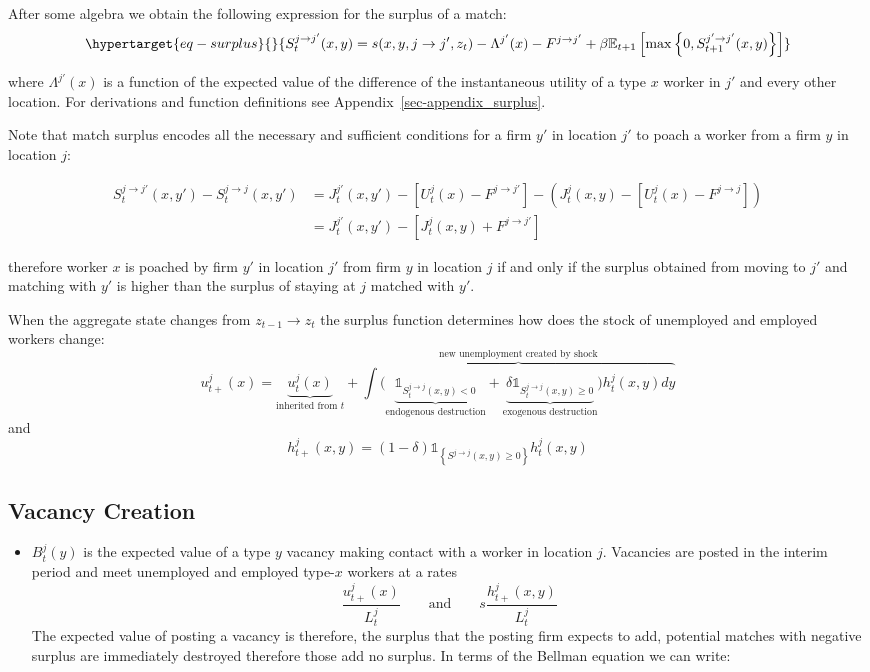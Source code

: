 \documentclass[
  letterpaper,
  DIV=11,
  numbers=noendperiod]{scrreprt}
\providecommand{\tightlist}{%
  \setlength{\itemsep}{0pt}\setlength{\parskip}{0pt}}\usepackage{longtable,booktabs,array}
\begin{document}
After some algebra we obtain the following expression for the surplus of
a match:
\begin{equation}\protect\hypertarget{eq-surplus}{}{S_{t}^{j\to j'}(x,y) = s(x,y,j \to j',z_t) - \Lambda^{j'}(x) - F^{j \to j'} + \beta\mathbb{E}_{t+1}\left[\max\left\{0, S^{j'\to j'}_{t+1}(x,y)\right\}\right]}\label{eq-surplus}\end{equation}

where \(\Lambda^{j'}(x)\) is a function of the expected value of the
difference of the instantaneous utility of a type \(x\) worker in \(j'\)
and every other location. For derivations and function definitions see
Appendix~\ref{sec-appendix_surplus}.

Note that match surplus encodes all the necessary and sufficient
conditions for a firm \(y'\) in location \(j'\) to poach a worker from a
firm \(y\) in location \(j\):

\begin{align*}
  S_t^{j\to j'}(x,y') - S^{j \to j}_t(x,y') &= J^{j'}_{t}(x,y') - [U^{j}_t(x) - F^{j\to j'}] - \left(J^{j}_{t}(x,y) - [U^{j}_t(x) - F^{j\to j}]\right) \\ 
  &=  J^{j'}_{t}(x,y') - [ J^{j}_{t}(x,y) + F^{j\to j'}]
\end{align*}

therefore worker \(x\) is poached by firm \(y'\) in location \(j'\) from
firm \(y\) in location \(j\) if and only if the surplus obtained from
moving to \(j'\) and matching with \(y'\) is higher than the surplus of
staying at \(j\) matched with \(y'\).

When the aggregate state changes from \(z_{t-1} \to z_t\) the surplus
function determines how does the stock of unemployed and employed
workers change:
\[u^{j}_{t+}(x) = \underbrace{u^j_t(x)}_{\text{inherited from }t} + \overbrace{\int \Big(\underbrace{\mathbb{1}_{S^{j \to j}_t(x,y)<0}}_{\text{endogenous destruction}} + \underbrace{\delta\mathbb{1}_{S^{j \to j}_t(x,y)\geq0}}_{\text{exogenous destruction}}\Big)h^j_t(x,y)dy}^{\text{new unemployment created by shock}}\]
and
\[h^{j}_{t+}(x,y) = (1-\delta)\mathbb{1}_{\left\{S^{j \to j}(x,y)\geq 0\right\}}h^j_t(x,y)\]

\hypertarget{vacancy-creation}{%
\subsection{Vacancy Creation}\label{vacancy-creation}}

\begin{itemize}
\tightlist
\item
  \(B^j_t(y)\) is the expected value of a type \(y\) vacancy making
  contact with a worker in location \(j\). Vacancies are posted in the
  interim period and meet unemployed and employed type-\(x\) workers at
  a rates
  \[\frac{u^j_{t+}(x)}{L^j_t} \qquad \text{and} \qquad s\frac{h^j_{t+}(x,y)}{L^j_t}\]
  The expected value of posting a vacancy is therefore, the surplus that
  the posting firm expects to add, potential matches with negative
  surplus are immediately destroyed therefore those add no surplus. In
  terms of the Bellman equation we can write:
\end{itemize}
\end{document}
